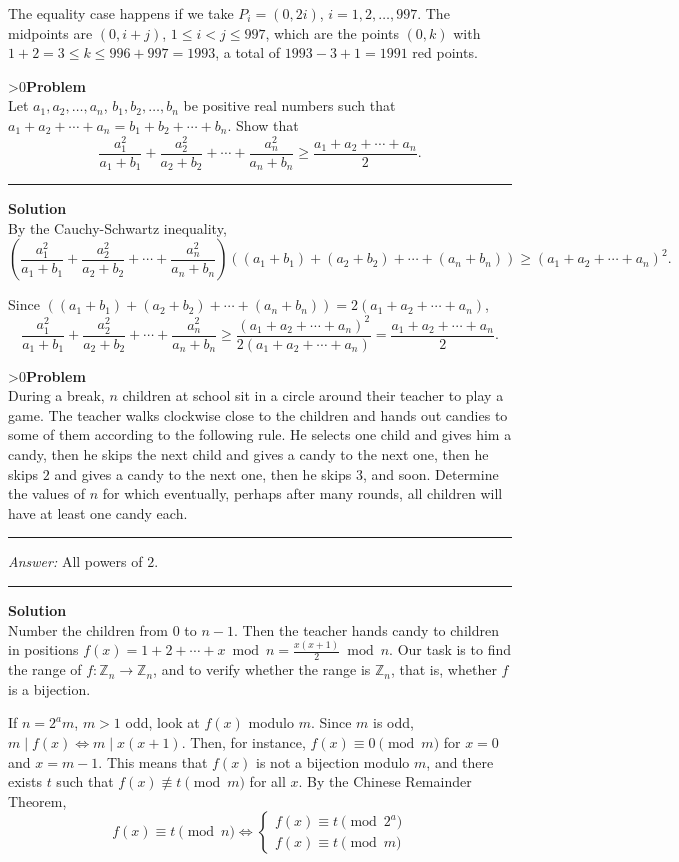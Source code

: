 \documentclass[12pt,oneside,a4paper]{book}
\newcounter{probnum}
\newcounter{solnum}
\newcommand{\prob}{\ifnum\value{probnum}>0\newpage\fi\setcounter{solnum}{0}\stepcounter{probnum}\textbf{Problem \theprobnum}\\}
\newcommand{\ans}{\medskip\hrule\medbreak\emph{Answer: }}
\newcommand{\sol}{\medskip\hrule\medbreak\textbf{Solution}\\}
\newcommand{\soln}{\stepcounter{solnum}\medskip\hrule\medbreak\textbf{Solution \thesolnum}\\}
\begin{document}
The equality case happens if we take $P_i = (0,2i)$, $i=1,2,\ldots,997$. The midpoints are $(0,i+j)$, $1\le i < j \le 997$, which are the points $(0,k)$ with $1+2 = 3 \le k \le 996+997 = 1993$, a total of $1993-3+1=1991$ red points.

\prob Let $a_1,a_2,\ldots,a_n$, $b_1,b_2,\ldots,b_n$ be positive real numbers such that $a_1+a_2+\cdots+a_n = b_1+b_2+\cdots+b_n$. Show that
\[\frac{a_1^2}{a_1+b_1} + \frac{a_2^2}{a_2+b_2} + \cdots + \frac{a_n^2}{a_n+b_n} \ge \frac{a_1+a_2+\cdots+a_n}2.\]

\sol
By the Cauchy-Schwartz inequality,
\[\left(\frac{a_1^2}{a_1+b_1} + \frac{a_2^2}{a_2+b_2} + \cdots + \frac{a_n^2}{a_n+b_n}\right)((a_1+b_1) + (a_2+b_2) + \cdots + (a_n+b_n)) \ge (a_1+a_2+\cdots+a_n)^2.\]

Since $((a_1+b_1) + (a_2+b_2) + \cdots + (a_n+b_n)) = 2(a_1+a_2+\cdots+a_n)$,
\[\frac{a_1^2}{a_1+b_1} + \frac{a_2^2}{a_2+b_2} + \cdots + \frac{a_n^2}{a_n+b_n} \ge \frac{(a_1+a_2+\cdots+a_n)^2}{2(a_1+a_2+\cdots+a_n)} = \frac{a_1+a_2+\cdots+a_n}2.\]

\prob During a break, $n$ children at school sit in a circle around their teacher to play a game.  The teacher walks clockwise close to the children and hands out candies to some of them according to the following rule. He selects one child and gives him a candy, then he skips the next child and gives a candy to the next one, then he skips $2$ and gives a candy to the next one, then he skips $3$, and soon. Determine the values of $n$ for which eventually, perhaps after many rounds, all children will have at least one candy each.

\ans All powers of $2$.

\soln
Number the children from $0$ to $n-1$. Then the teacher hands candy to children in positions $f(x) = 1 + 2 + \cdots + x\bmod n = \frac{x(x+1)}2\bmod n$. Our task is to find the range of $f\colon \mathbb{Z}_n \to \mathbb{Z}_n$, and to verify whether the range is $\mathbb{Z}_n$, that is, whether $f$ is a bijection.

If $n = 2^am$, $m>1$ odd, look at $f(x)$ modulo $m$. Since $m$ is odd, $m \mid f(x)\iff m\mid x(x+1)$. Then, for instance, $f(x) \equiv 0\pmod m$ for $x=0$ and $x=m-1$. This means that $f(x)$ is not a bijection modulo $m$, and there exists $t$ such that $f(x)\not\equiv t\pmod m$ for all $x$. By the Chinese Remainder Theorem, 
\[f(x) \equiv t \pmod n\iff
\left\{\begin{split}
f(x)\equiv t\pmod{2^a}\\
f(x)\equiv t\pmod m
\end{split}\right.\]
\end{document}
